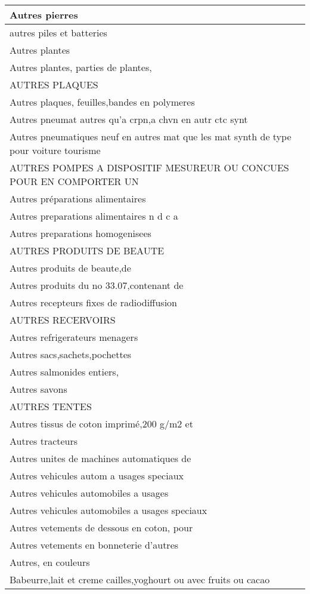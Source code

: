 \documentclass[
]{book}
\begin{document}
\begin{table}
\begin{tabular}[t]{l}
\hline
Autres pierres\\
\hline
autres piles et batteries\\
\hline
Autres plantes\\
\hline
Autres plantes, parties de plantes,\\
\hline
AUTRES PLAQUES\\
\hline
Autres plaques, feuilles,bandes en polymeres\\
\hline
Autres pneumat autres qu'a crpn,a chvn en autr ctc synt\\
\hline
Autres pneumatiques neuf en autres mat que les mat synth de type pour voiture tourisme\\
\hline
AUTRES POMPES A DISPOSITIF MESUREUR OU CONCUES POUR EN COMPORTER UN\\
\hline
Autres préparations alimentaires\\
\hline
Autres preparations alimentaires n d c a\\
\hline
Autres preparations homogenisees\\
\hline
AUTRES PRODUITS DE BEAUTE\\
\hline
Autres produits de beaute,de\\
\hline
Autres produits du no 33.07,contenant de\\
\hline
Autres recepteurs fixes de radiodiffusion\\
\hline
AUTRES RECERVOIRS\\
\hline
Autres refrigerateurs menagers\\
\hline
Autres sacs,sachets,pochettes\\
\hline
Autres salmonides entiers,\\
\hline
Autres savons\\
\hline
AUTRES TENTES\\
\hline
Autres tissus de coton imprimé,200 g/m2 et\\
\hline
Autres tracteurs\\
\hline
Autres unites de machines automatiques de\\
\hline
Autres vehicules autom a usages speciaux\\
\hline
Autres vehicules automobiles a usages\\
\hline
Autres vehicules automobiles a usages speciaux\\
\hline
Autres vetements de dessous en coton, pour\\
\hline
Autres vetements en bonneterie d'autres\\
\hline
Autres, en couleurs\\
\hline
Babeurre,lait et creme cailles,yoghourt ou avec fruits ou cacao\\

\end{tabular}
\end{table}
\end{document}
